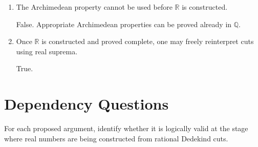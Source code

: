 \documentclass{self-check}
\begin{document}
\begin{enumerate}[label=\arabic{*}., itemsep=10pt]
    \begin{answer}
      False.
    \end{answer}
  \item The Archimedean property cannot be used before \(\mathbb{R}\) is constructed.

    \begin{answer}
      False. Appropriate Archimedean properties can be proved already in \(\mathbb{Q}\).
    \end{answer}
  \item Once \(\mathbb{R}\) is constructed and proved complete, one may freely reinterpret cuts using real suprema.

    \begin{answer}
      True.
    \end{answer}
\end{enumerate}

\section{Dependency Questions}

For each proposed argument, identify whether it is logically valid at the stage where real numbers are being constructed from rational Dedekind cuts.
\end{document}
